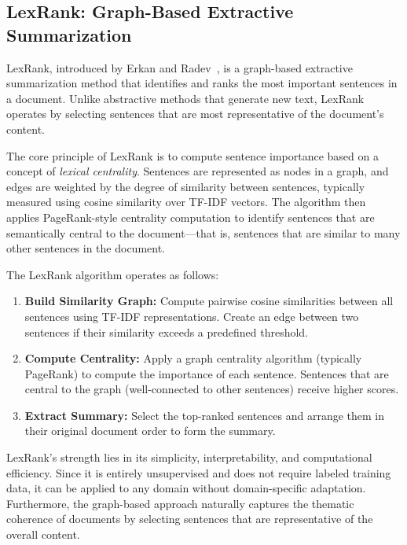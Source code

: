 \subsection{LexRank: Graph-Based Extractive Summarization}

LexRank, introduced by Erkan and Radev~\cite{erkan2004lexrank}, is a graph-based extractive summarization method that identifies and ranks the most important sentences in a document. Unlike abstractive methods that generate new text, LexRank operates by selecting sentences that are most representative of the document's content.

The core principle of LexRank is to compute sentence importance based on a concept of \textit{lexical centrality}. Sentences are represented as nodes in a graph, and edges are weighted by the degree of similarity between sentences, typically measured using cosine similarity over TF-IDF vectors. The algorithm then applies PageRank-style centrality computation to identify sentences that are semantically central to the document—that is, sentences that are similar to many other sentences in the document.

The LexRank algorithm operates as follows:

\begin{enumerate}
    \item \textbf{Build Similarity Graph:} Compute pairwise cosine similarities between all sentences using TF-IDF representations. Create an edge between two sentences if their similarity exceeds a predefined threshold.
    
    \item \textbf{Compute Centrality:} Apply a graph centrality algorithm (typically PageRank) to compute the importance of each sentence. Sentences that are central to the graph (well-connected to other sentences) receive higher scores.
    
    \item \textbf{Extract Summary:} Select the top-ranked sentences and arrange them in their original document order to form the summary.
\end{enumerate}

LexRank's strength lies in its simplicity, interpretability, and computational efficiency. Since it is entirely unsupervised and does not require labeled training data, it can be applied to any domain without domain-specific adaptation. Furthermore, the graph-based approach naturally captures the thematic coherence of documents by selecting sentences that are representative of the overall content.


